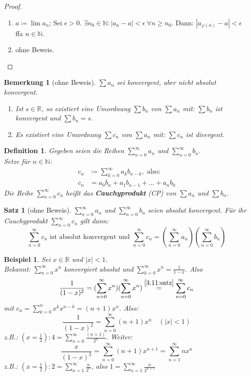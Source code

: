 \documentclass[14pt,titlepage,ngerman,a4paper,headsepline,DIV15,halfparskip*]{scrartcl}
\newcommand{\N}{\mathbb{N}}
\newcommand{\R}{\mathbb{R}}
\theoremstyle{named}
\theoremstyle{dotless}
\newtheorem{satz}[namedtheorem]{Satz}
\newtheorem*{beispiel*}{Beispiel}
\newtheorem*{bemerkung}{Bemerkung}
\newtheorem*{definition}{Definition}
\begin{document}
\begin{proof} ~\
	\begin{enumerate}
		\item $a \coloneqq \lim a_{n}$; Sei $\epsilon > 0$. $\exists n_{0} \in \N: |a_{n} - a| < \epsilon ~\forall n \geq n_{0}$. Dann: $|a_{\varphi(n)} - a| < \epsilon$ ffa $n \in \N$.
		\item ohne Beweis.
	\end{enumerate}	
\end{proof}


\begin{bemerkung}[ohne Beweis]
	$\sum a_{n}$ sei konvergent, aber nicht absolut konvergent.
	\begin{enumerate}
		\item Ist $s \in \R$, so existiert eine Umordnung $\sum b_{n}$ von $\sum a_{n}$ mit: $\sum b_{n}$ ist konvergent und $\sum b_{n} = s$.
		\item Es existiert eine Umordnung $\sum c_{n}$ von $\sum a_{n}$ mit: $\sum c_{n}$ ist divergent.
	\end{enumerate}
\end{bemerkung}

\begin{definition}
	Gegeben seien die Reihen $\sum_{n=0}^{\infty} a_{n}$ und $\sum_{n=0}^{\infty} b_{n}$. \\
	Setze für $n \in \N$:
	\begin{align*}
		c_{n} & \coloneqq \sum_{k=0}^{\infty} a_{k} b_{n-k}, \text{ also: } \\
		c_{n} & = a_{0} b_{n} + a_{1} b_{n-1} + \dotsc + a_{n} b_{0}
	\end{align*} 
	Die Reihe $\sum_{n=0}^{\infty} c_{n}$ hei{\ss}t das \textbf{Cauchyprodukt} (CP) von $\sum a_{n}$ und $\sum b_{n}$.
\end{definition}


\begin{satz}[ohne Beweis] \label{3.11:satz}
$\sum_{n=0}^{\infty} a_{n}$ und $\sum_{n=0}^{\infty} b_{n}$ seien absolut konvergent. Für ihr Cauchyprodukt $\sum_{n=0}^{\infty} c_{n}$ gilt dann:
	$$ \sum_{n=0}^{\infty} c_{n} \text{ ist absolut konvergent und } \sum_{n=0}^{\infty} c_{n} = (\sum_{n=0}^{\infty} a_{n}) (\sum_{n=0}^{\infty} b_{n}) $$
\end{satz}


\begin{beispiel*}
	Sei $x \in \R$ und $|x | < 1$. \\
	Bekannt: $\sum_{n=0}^{\infty} x^{n}$ konvergiert absolut und	 $\sum_{k=0}^{\infty} x^{n} = \frac{1}{1-x}$. Also
	$$ \frac{1}{(1-x)^{2}} = (\sum_{n=0}^{\infty} x^{n})(\sum_{n=0}^{\infty} x^{n}) \overset{\ref{3.11:satz}}{=} \sum_{n=0}^{\infty} c_{n} $$
	mit $c_{n} = \sum_{k=0}^{n} x^{k} x^{n-k} = (n+1)x^{n}$. Also:
	$$ \frac{1}{(1-x)^{2}} = \sum_{n=0}^{\infty} (n+1) x^{n} \quad (|x| < 1) $$
	z.B.: $(x = \frac{1}{2}): 4 = \sum_{n=0}^{\infty} \frac{(n+1)}{2^{n}}$. Weiter:
	$$ \frac{x}{(1-x)^{2}} = \sum_{n=0}^{\infty} (n+1) x^{n+1} = \sum_{n=1}^{\infty} n x^{n} $$
	z.B.: $(x = \frac{1}{2}): 2 = \sum_{n=1}^{\infty} \frac{n}{2^{n}}$, also $1 = \sum_{n=1}^{\infty} \frac{n}{2^{n+1}}$
\end{beispiel*}
\end{document}
